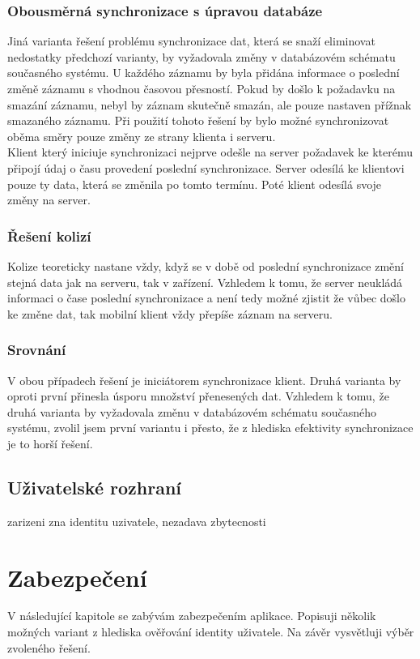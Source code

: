 \documentclass{diplomka}
\begin{document}
\subsection{Obousměrná synchronizace s úpravou databáze}
Jiná varianta řešení problému synchronizace dat, která se snaží eliminovat nedostatky předchozí varianty, by vyžadovala změny v databázovém schématu současného systému. U každého záznamu by byla přidána informace o poslední změně záznamu s vhodnou časovou přesností. Pokud by došlo k požadavku na smazání záznamu, nebyl by záznam skutečně smazán, ale pouze nastaven přížnak smazaného záznamu. Při použití tohoto řešení by bylo možné synchronizovat oběma směry pouze změny ze strany klienta i serveru. \\ \indent
Klient který iniciuje synchronizaci nejprve odešle na server požadavek ke kterému připojí údaj o času provedení poslední synchronizace. Server odesílá ke klientovi pouze ty data, která se změnila po tomto termínu. Poté klient odesílá svoje změny na server.

\subsection{Řešení kolizí}
Kolize teoreticky nastane vždy, když se v době od poslední synchronizace změní stejná data jak na serveru, tak v zařízení. Vzhledem k tomu, že server neukládá informaci o čase poslední synchronizace a není tedy možné zjistit že vůbec došlo ke změne dat, tak mobilní klient vždy přepíše záznam na serveru.

\subsection{Srovnání}
V obou případech řešení je iniciátorem synchronizace klient. Druhá varianta by oproti první přinesla úsporu množství přenesených dat. Vzhledem k tomu, že druhá varianta by vyžadovala změnu v databázovém schématu současného systému, zvolil jsem první variantu i přesto, že z hlediska efektivity synchronizace je to horší řešení.

\section{Uživatelské rozhraní}
zarizeni zna identitu uzivatele, nezadava zbytecnosti

\chapter{Zabezpečení}
V následující kapitole se zabývám zabezpečením aplikace. Popisuji několik možných variant z hlediska ověřování identity uživatele. Na závěr vysvětluji výběr zvoleného řešení.
\end{document}
